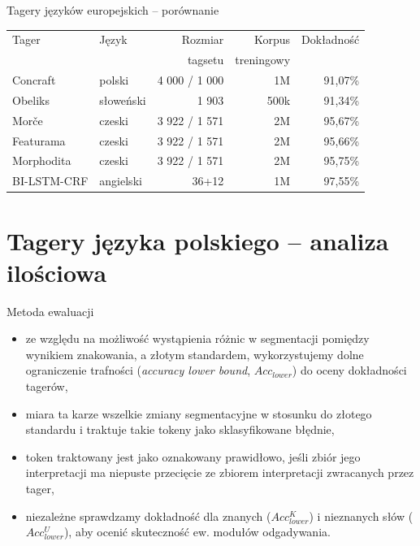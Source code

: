 \documentclass[xcolor=dvipsnames,polish]{beamer}
\begin{document}
\begin{frame}{Tagery języków europejskich -- porównanie}
  \begin{center}
  \begin{tabular}{l|l|r|r|r}
    Tager       & Język     & Rozmiar & Korpus  & Dokładność \\
                &           & tagsetu & treningowy & \\ \hline
    Concraft    & polski    & 4 000 / 1 000 & 1M    & 91,07\% \\
    Obeliks     & słoweński & 1 903 & 500k  & 91,34\% \\
    Morče       & czeski    & 3 922 / 1 571 & 2M    & 95,67\% \\
    Featurama   & czeski    & 3 922 / 1 571 & 2M    & 95,66\% \\
    Morphodita  & czeski    & 3 922 / 1 571 & 2M    & 95,75\% \\
    BI-LSTM-CRF & angielski & 36+12   & 1M   & 97,55\% \\
  \end{tabular}
  \end{center}
\end{frame}

\section{Tagery języka polskiego -- analiza ilościowa}
\frame{\sectionpage}

\begin{frame}{Metoda ewaluacji}
\begin{itemize}
\item ze względu na możliwość wystąpienia różnic w segmentacji pomiędzy wynikiem znakowania, a złotym standardem, wykorzystujemy dolne ograniczenie trafności (\emph{accuracy lower bound}, $Acc_{lower}$) do oceny dokładności tagerów,
\item miara ta karze wszelkie zmiany segmentacyjne w stosunku do złotego standardu i traktuje takie tokeny jako sklasyfikowane błędnie,
\item token traktowany jest jako oznakowany prawidłowo, jeśli zbiór jego interpretacji ma niepuste przecięcie ze zbiorem interpretacji zwracanych przez tager,
\item niezależne sprawdzamy dokładność dla znanych ($Acc^K_{lower}$) i nieznanych słów ($Acc^U_{lower}$), aby ocenić skuteczność ew. modułów odgadywania.
\end{itemize}
\end{frame}
\end{document}
